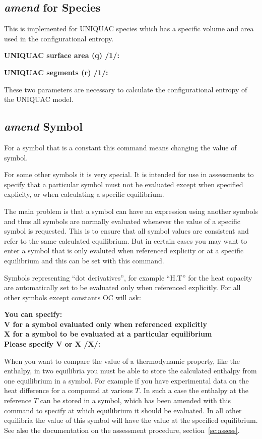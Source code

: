 \documentclass[11pt]{article}
\begin{document}
\hypertarget{Amend species}{}
\subsection{{\em amend} for Species}

This is implemented for UNIQUAC species which has a specific volume
and area used in the configurational entropy.

{\bf UNIQUAC surface area (q) /1/:}

{\bf UNIQUAC segments (r) /1/:}

These two parameters are necessary to calculate the configurational
entropy of the UNIQUAC model.

\hypertarget{Amend symbol}{}
\subsection{{\em amend} Symbol}\label{sc:amendsym}

For a symbol that is a constant this command means changing the value
of symbol.

For some other symbols it is very special.  It is intended for use in
assessments to specify that a particular symbol must not be evaluated
except when specified explicity, or when calculating a specific
equilibrium.

The main problem is that a symbol can have an expression using another
symbols and thus all symbols are normally evaluated whenever the value
of a specific symbol is requested.  This is to ensure that all symbol
values are consistent and refer to the same calculated equilibrium.
But in certain cases you may want to enter a symbol that is only
evaluted when referenced explicity or at a specific equilibrium and
this can be set with this command.

Symbols representing ``dot derivatives'', for example ``H.T'' for the
heat capacity are automatically set to be evaluated only when
referenced explicitly.  For all other symbols except constants OC will
ask:

{\bf You can specify:\\
  V for a symbol evaluated only when referenced explicitly\\
  X for a symbol to be evaluated at a particular equilibrium\\
  Please specify V or X /X/:}

When you want to compare the value of a thermodynamic property, like
the enthalpy, in two equilibria you must be able to store the
calculated enthalpy from one equilibrium in a symbol.  For example if
you have experimental data on the heat difference for a compound at
various $T$.  In such a case the enthalpy at the reference $T$ can be
stored in a symbol, which has been amended with this command to
specify at which equilibrium it should be evaluated.  In all other
equilibria the value of this symbol will have the value at the
specified equilibrium.  See also the documentation on the assessment
procedure, section~\ref{sc:assess}.
\end{document}
